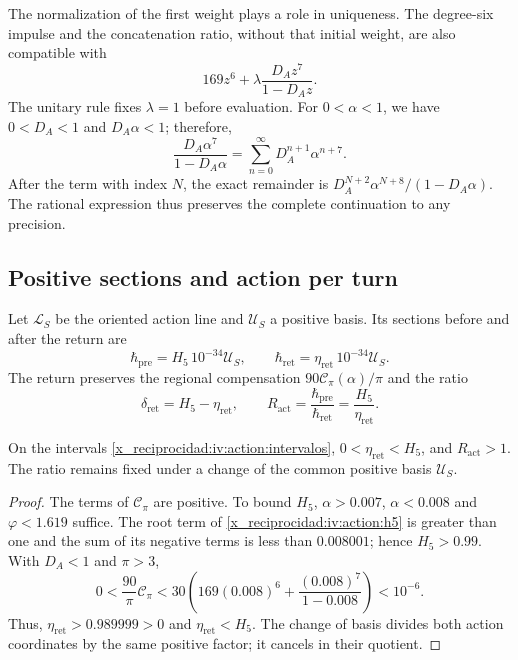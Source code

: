 The normalization of the first weight plays a role in uniqueness.
The degree-six impulse and the concatenation ratio, without that
initial weight, are also compatible with
\[
 169z^6+\lambda\frac{D_Az^7}{1-D_Az}.
\]
The unitary rule fixes \(\lambda=1\) before evaluation.
For \(0<\alpha<1\), we have \(0<D_A<1\) and \(D_A\alpha<1\);
therefore,
\begin{equation}
 \frac{D_A\alpha^7}{1-D_A\alpha}
   =\sum_{n=0}^{\infty}D_A^{n+1}\alpha^{n+7}.
 \label{x_reciprocidad:iv:action:cola}
\end{equation}
After the term with index \(N\), the exact remainder is
\(D_A^{N+2}\alpha^{N+8}/(1-D_A\alpha)\). The rational expression
thus preserves the complete continuation to any precision.

\subsection{Positive sections and action per turn}
\label{x_reciprocidad:iv:action:secciones}

Let \(\mathcal L_S\) be the oriented action line and
\(\mathcal U_S\) a positive basis. Its sections before and
after the return are
\begin{equation}
 \hbar_{\mathrm{pre}}=H_5\,10^{-34}\mathcal U_S,\qquad
 \hbar_{\mathrm{ret}}=\eta_{\mathrm{ret}}\,10^{-34}\mathcal U_S.
 \label{x_reciprocidad:iv:action:hbar}
\end{equation}
The return preserves the regional compensation
\(90\mathcal C_\pi(\alpha)/\pi\) and the ratio
\begin{equation}
 \delta_{\mathrm{ret}}=H_5-\eta_{\mathrm{ret}},\qquad
 R_{\mathrm{act}}=\frac{\hbar_{\mathrm{pre}}}
                        {\hbar_{\mathrm{ret}}}
                =\frac{H_5}{\eta_{\mathrm{ret}}}.
 \label{x_reciprocidad:iv:action:razon}
\end{equation}

\begin{proposition}
\label{x_reciprocidad:iv:action:positividad}
On the intervals \eqref{x_reciprocidad:iv:action:intervalos},
\(0<\eta_{\mathrm{ret}}<H_5\), and \(R_{\mathrm{act}}>1\).
The ratio remains fixed under a change of the common positive
basis \(\mathcal U_S\).
\end{proposition}
\begin{proof}
The terms of \(\mathcal C_\pi\) are positive. To bound
\(H_5\), \(\alpha>0.007\), \(\alpha<0.008\) and
\(\varphi<1.619\) suffice. The root term of \eqref{x_reciprocidad:iv:action:h5}
is greater than one and the sum of its negative terms is less
than \(0.008001\); hence \(H_5>0.99\).
With \(D_A<1\) and \(\pi>3\),
\[
 0<\frac{90}{\pi}\mathcal C_\pi
 <30\left(169(0.008)^6+
             \frac{(0.008)^7}{1-0.008}\right)<10^{-6}.
\]
Thus, \(\eta_{\mathrm{ret}}>0.989999>0\) and
\(\eta_{\mathrm{ret}}<H_5\). The change of basis divides both
action coordinates by the same positive factor; it
cancels in their quotient.
\end{proof}

